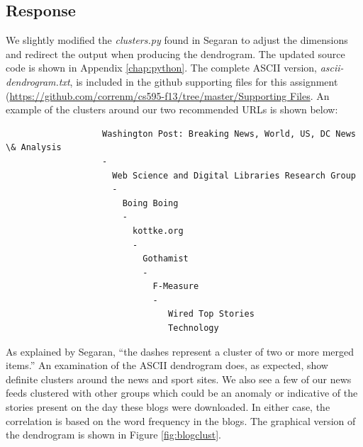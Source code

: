 \documentclass[letterpaper,11pt]{report}
\begin{document}
\begin{savenotes}
\subsection{Response}We slightly modified the \emph{clusters.py} found in Segaran \cite{segaran2007programming} to adjust the dimensions and redirect the output when producing the dendrogram. The updated source code is shown in Appendix \ref{chap:python}. The complete ASCII version, \emph{ascii-dendrogram.txt}, is included in the github supporting files for this assignment (\url{https://github.com/correnm/cs595-f13/tree/master/Supporting Files}. An example of the clusters around our two recommended URLs is shown below:

\begin{verbatim}
                   Washington Post: Breaking News, World, US, DC News \& Analysis
                   -
                     Web Science and Digital Libraries Research Group
                     -
                       Boing Boing
                       -
                         kottke.org
                         -
                           Gothamist
                           -
                             F-Measure
                             -
                                Wired Top Stories
                                Technology
\end{verbatim}
																									
As explained by Segaran, ``the dashes represent a cluster of two or more  merged  items.'' An examination of the ASCII dendrogram does, as expected, show definite clusters around the news and sport sites.  We also see a few of our news feeds clustered with other groups which could be an anomaly or indicative of the stories present on the day these blogs were downloaded. In either case, the correlation is based on the word frequency in the blogs. The graphical version of the dendrogram is shown in Figure \ref{fig:blogclust}.


\end{savenotes}
\end{document}
